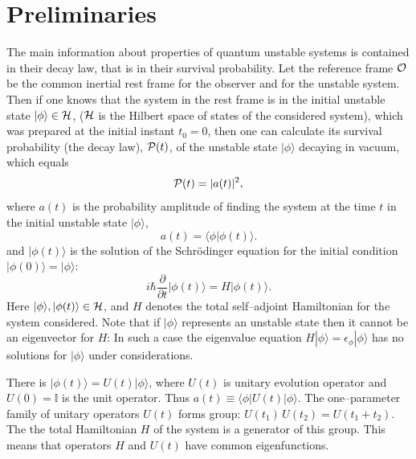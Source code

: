 \documentclass[12pt]{article}
\begin{document}
\section{Preliminaries}
The main information about properties of  quantum unstable   systems
is contained in their decay law, that is in their survival probability.
Let the reference frame ${\cal O}$ be the common inertial rest
frame for the observer and for the unstable system.
Then  if one knows that the system in the rest frame is in the initial unstable
state $|\phi\rangle \in {\cal H}$, (${\cal H}$ is
 the Hilbert space of states of the considered system), which was prepared at the initial instant $t_{0} =0$,
then one can calculate
its survival probability (the decay law), ${\cal P}(t)$, of the unstable state $|\phi\rangle$ decaying
in vacuum, which equals
\begin{equation}
{\cal P}(t) = |a(t)|^{2}, \label{P(t)}
\end{equation}
where $a(t)$ is  the probability amplitude of finding the system at the
time $t$ in the initial unstable state $|\phi\rangle$,
\begin{equation}
a(t) = \langle \phi|\phi (t) \rangle . \label{a(t)}
\end{equation}
and $|\phi (t)\rangle$ is the solution of the Schr\"{o}dinger equation
for the initial condition  $|\phi (0) \rangle = |\phi\rangle$:
 \begin{equation}
i\hbar \frac{\partial}{\partial t} |\phi (t) \rangle = H |\phi (t)\rangle.  \label{Schrod}
\end{equation}
 Here $|\phi \rangle, |\phi (t)\rangle \in {\cal H}$,  and
 $H$ denotes the total self--adjoint Hamiltonian for the system considered. Note that if $|\phi\rangle$ represents an unstable state then it cannot be
 an eigenvector for $H$: In such a case the eigenvalue equation $H|\phi\rangle = \epsilon_{\phi} |\phi\rangle$ has no solutions for $|\phi \rangle$ under considerations.

There is $|\phi (t)\rangle = U(t) |\phi\rangle$, where $U(t)$ is unitary evolution operator and $U(0) = \mathbb{I}$ is the unit operator. Thus
$a(t) \equiv \langle \phi|U(t)|\phi\rangle$.
The one--parameter family of unitary operators $U(t)$ forms group: $U(t_{1})\,U(t_{2}) = U(t_{1} + t_{2})$. The the total Hamiltonian $H$ of the system is a generator of this group.
This means that operators $H$ and $U(t)$ have common eigenfunctions.
\end{document}
